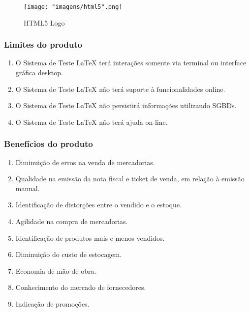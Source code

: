 \documentclass[12pt]{article}
\begin{document}
			\begin{figure}[!h]
				\caption{HTML5 Logo}
				\centering
				\texttt{[image: "imagens/html5".png]}
			\end{figure}
				
		\subsubsection{Limites do produto}
			\begin{enumerate}
					\item O Sistema de Teste LaTeX terá interações somente via terminal ou interface gráfica desktop.
					\item O Sistema de Teste LaTeX não terá suporte à funcionalidades online.
					\item O Sistema de Teste LaTeX não persistirá informações utilizando SGBDs.
					\item O Sistema de Teste LaTeX não terá ajuda on-line.
			\end{enumerate}
						
		\subsubsection{Benefícios do produto}
		
			\begin{enumerate}
				\item Diminuição de erros na  venda de mercadorias.
				\item Qualidade na emissão da nota fiscal e ticket de venda, em relação à emissão manual.
				\item Identificação de distorções entre o vendido e o estoque.
				\item Agilidade na compra de mercadorias.
				\item Identificação de produtos mais e menos vendidos.
				\item Diminuição do custo de estocagem.
				\item Economia de mão-de-obra.
				\item Conhecimento do mercado de fornecedores.
				\item Indicação de promoções.
			\end{enumerate}
			

			
\end{document}
